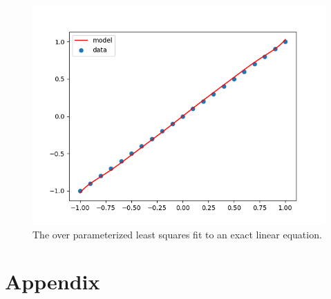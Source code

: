 \documentclass{article}
\begin{document}
\begin{figure}[!h]
    \centering
    \includegraphics[width = .875\textwidth]{Ch2_Problem5.png}
    \caption{The over parameterized least squares fit to an exact linear equation.}
    \label{p5}
\end{figure}






\newpage
\section*{Appendix}
\end{document}
